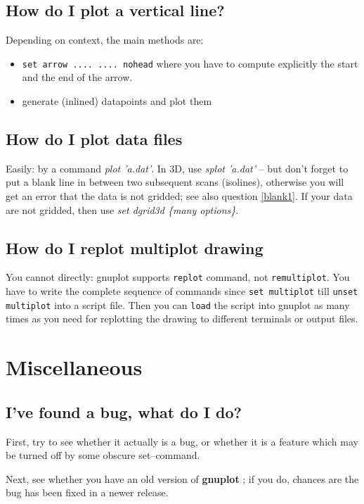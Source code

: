 \documentclass[a4paper,11pt]{article}
\newcommand{\gnuplot}{\textbf{gnuplot }}
\begin{document}
\subsection{How do I plot a vertical line?}

Depending on context, the main methods are:
\begin{itemize}
\item \verb+set arrow .... .... nohead+ where you have to compute
explicitly the start and the end of the arrow.
\item generate (inlined) datapoints and plot them
\end{itemize}


\subsection{How do I plot data files}

Easily: by a command \textit{plot 'a.dat'}. In 3D, use \textit{splot 'a.dat'} --
but don't forget to put a blank line in between two subsequent scans (isolines),
otherwise you will get an error that the data is not gridded; see also question 
\ref{blank1}. If your data are not gridded, then use \textit{set dgrid3d \{many
options\}}.


\subsection{How do I replot multiplot drawing}

You cannot directly: gnuplot supports \verb+replot+ command, not
\verb+remultiplot+. You have to write the complete sequence of commands since
\verb+set multiplot+ till \verb+unset multiplot+ into a script file. Then
you can \verb+load+ the script into gnuplot as many times as you need for
replotting the drawing to different terminals or output files.


\section{Miscellaneous}

\subsection{I've found a bug, what do I do?}

First, try to see whether it actually is a bug, or whether it
is a feature which may be turned off by some obscure set--command.

Next, see whether you have an old version of \gnuplot; if you do,
chances are the bug has been fixed in a newer release.
\end{document}
